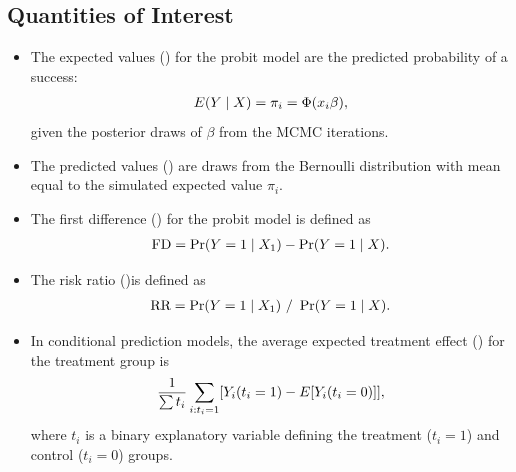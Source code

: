 \documentclass[letterpaper,10pt,english]{sphinxmanual}
\begin{document}
\subsection{Quantities of Interest}
\label{vignette:id114}\begin{itemize}
\item {} 
The expected values () for the probit model are the
predicted probability of a success:
\begin{gather}
\begin{split}\begin{aligned}
E(Y \mid X) = \pi_{i}= \Phi(x_i \beta),\end{aligned}\end{split}\notag
\end{gather}
given the posterior draws of \(\beta\) from the MCMC iterations.

\item {} 
The predicted values () are draws from the Bernoulli
distribution with mean equal to the simulated expected value
\(\pi_{i}\).

\item {} 
The first difference () for the probit model is defined as
\begin{gather}
\begin{split}\begin{aligned}
\text{FD}=\Pr(Y=1\mid X_{1})-\Pr(Y=1\mid X).\end{aligned}\end{split}\notag
\end{gather}
\item {} 
The risk ratio ()is defined as
\begin{gather}
\begin{split}\begin{aligned}
\text{RR}=\Pr(Y=1\mid X_{1})\ /\ \Pr(Y=1\mid X).\end{aligned}\end{split}\notag
\end{gather}
\item {} 
In conditional prediction models, the average expected treatment
effect () for the treatment group is
\begin{gather}
\begin{split}\begin{aligned}
\frac{1}{\sum t_{i}}\sum_{i:t_{i}=1}[Y_{i}(t_{i}=1)-E[Y_{i}(t_{i}=0)]],\end{aligned}\end{split}\notag
\end{gather}
where \(t_{i}\) is a binary explanatory variable defining the
treatment (\(t_{i}=1\)) and control (\(t_{i}=0\)) groups.


\end{itemize}
\end{document}
